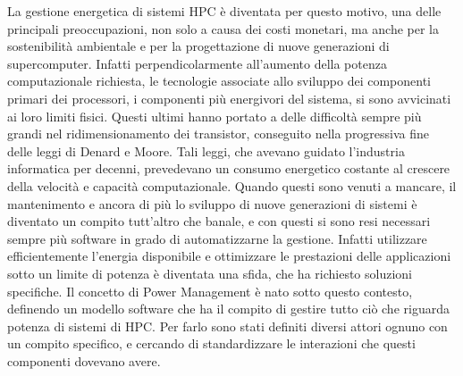 La gestione energetica di sistemi HPC è diventata per questo motivo, una delle principali preoccupazioni, non solo a causa dei costi monetari, ma anche per la sostenibilità ambientale e per la progettazione di nuove generazioni\cite{TODO} di supercomputer. Infatti perpendicolarmente all'aumento della potenza computazionale richiesta, le tecnologie associate allo sviluppo dei componenti primari dei processori, i componenti più energivori del sistema, si sono avvicinati ai loro limiti fisici.
Questi ultimi hanno portato a delle difficoltà sempre più grandi nel ridimensionamento dei transistor, conseguito nella progressiva fine delle leggi di Denard e Moore\cite{TODO}. Tali leggi, che avevano guidato l'industria informatica per decenni, prevedevano un consumo energetico costante al crescere della velocità e capacità computazionale. Quando questi sono venuti a mancare, il mantenimento e ancora di più lo sviluppo di nuove generazioni di sistemi è diventato un compito tutt'altro che banale, e con questi si sono resi necessari sempre più software in grado di automatizzarne la gestione. 
Infatti utilizzare efficientemente l'energia disponibile e ottimizzare le prestazioni delle applicazioni sotto un limite di potenza è diventata una sfida, che ha richiesto soluzioni specifiche. %
Il concetto di Power Management è nato sotto questo contesto, definendo un modello software che ha il compito di gestire tutto ciò che riguarda potenza %
di sistemi di HPC. Per farlo sono stati definiti diversi attori ognuno con un compito specifico, e cercando di standardizzare le interazioni che questi componenti dovevano avere.

